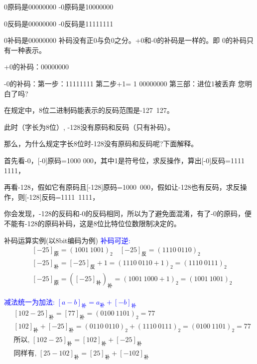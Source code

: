 \note
{
	0原码是00000000 -0原码是10000000
	
	0反码是00000000 -0反码是11111111
	
	0补码是00000000 补码没有正0与负0之分。+0和-0的补码是一样的。即 0的补码只有一种表示。
	
	+0的补码：00000000
	
	-0的补码：第一步：11111111 第二步+1= 1 00000000 第三部：进位1被丢弃 您明白了吗?
	
	在规定中，8位二进制码能表示的反码范围是-127~127。
	
	此时（字长为8位）, -128没有原码和反码（只有补码）。
	
	那么，为什么规定字长8位时-128没有原码和反码呢?下面解释。
	
	首先看-0，[-0]原码=1000 000，其中1是符号位，求反操作，算出[-0]反码=1111 1111，
	
	再看-128，假如它有原码且[-128]原码=1000~000，假如让-128也有反码，求反操作，则[-128]反码=1111~1111，
	
	你会发现，-128的反码和-0的反码相同，所以为了避免面混淆，有了-0的原码，便不能有-128的原码补码，这是8位比特位位数限制决定的。
}

\begin{frame}{补码运算实例(以8bit编码为例)}
\textcolor{blue}{补码可逆:}
\begin{align*}
&[-25]_{\text{原}}=(1001~1001)_2\quad [-25]_{\text{反}}=(1110~0110)_2\\
&[-25]_{\text{补}}=[-25]_{\text{反}}+1=(1110~0110+1)_2=(1110~0111)_2\\
&[-25]_{\text{原}}=\left([-25]_{\text{补}}\right)_{\text{补}}=(1001~1000+1)_2=(1001~1001)_2
\end{align*}

\textcolor{blue}{减法统一为加法: $[a-b]_{\text{补}}=a_{\text{补}}+[-b]_{\text{补}}$}
\begin{align*}
&[102-25]_{\text{补}}=[77]_{\text{补}}=(0100~1101)_2=77\\
&[102]_{\text{补}}+[-25]_{\text{补}}=(0110~0110)_2+(1110~0111)_2=(0100~1101)_2=77\\
&\text{所以, }[102-25]_{\text{补}}=[102]_{\text{补}}+[-25]_{\text{补}}\\
&\text{同样有, }[25-102]_{\text{补}}=[25]_{\text{补}}+[-102]_{\text{补}}\\
\end{align*}
\end{frame}

